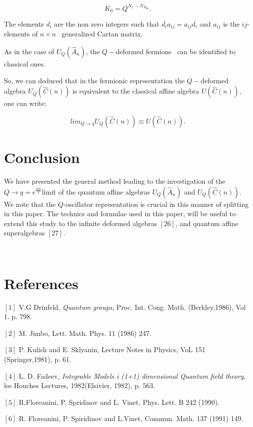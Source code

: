 \documentclass[a4paper,12pt,thmsa]{article}
\begin{document}
\begin{equation}
K_0=Q^{N_1-N_{B_{2n}}}.
\end{equation}

The elements $d_{i}$ are the non zero integers such that $%
d_{i}a_{ij}=a_{ij}d_{i}$ and $a_{ij}$ is the $ij$-elements of $n\times n$ \
generalized Cartan matrix.

As in the case of $U_Q(\hat A_n)$, the $Q-$deformed fermions \ can be
identified to classical ones.

So, we can deduced that in the fermionic representation the $Q-$deformed
algebra $U_Q(\widehat{C}(n))$ is equivalent to the classical affine algebra $%
U(\widehat{C}(n))$, one can write:

\[
lim_{Q\rightarrow q}U_Q(\widehat{C}(n))\equiv U(\widehat{C}(n)).
\]

\section{Conclusion}

We have presented the general method leading to the investigation of the $%
Q\rightarrow q=e^{\frac{2i\pi }k}$limit of the quantum affine algebras $%
U_Q(\hat A_n)$ and $U_Q(\widehat{C}(n)).$ We note that the $Q$-oscillator
representation is crucial in this manner of splitting in this paper. The
technics and formulae used in this paper, will be useful to extend this
study to the infinite deformed algebras $[26]$, and quantum affine
superalgebras $[27].$

\newpage\

\section*{References}

$[1]$ V.G Drinfeld, \textit{Quantum groups}, Proc. Int. Cong. Math.
(Berkley,1986), Vol 1. p. 798.

$[2]$ M. Jimbo, Lett. Math. Phys. 11 (1986) 247.

$[3]$ P. Kulish and E. Sklyanin, Lecture Notes in Physics, VoL 151
(Springer,1981), p. 61.

$[4]$ L. D. Fadeev, \textit{Integrable Models i (1+1) dimensional Quantum
field theory}, les Houches Lectures, 1982(Elsivier, 1982), p. 563.

$[5]$ R.Floreanini, P. Spridinov and L. Vinet, Phys. Lett. B 242 (1990).

$[6]$ R. Floreanini, P. Spiridinov and L.Vinet, Commun. Math. 137 (1991) 149.
\end{document}

